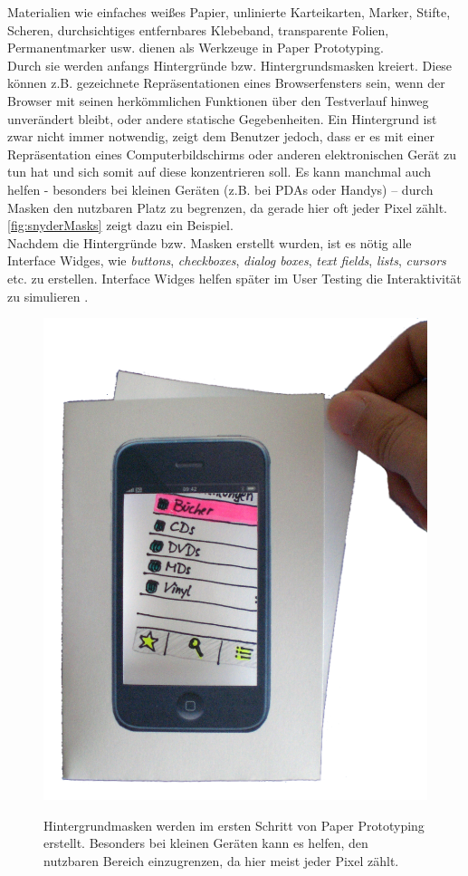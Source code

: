 \medskip Materialien wie einfaches weißes Papier, unlinierte Karteikarten, Marker, Stifte, Scheren, durchsichtiges entfernbares Klebeband, transparente Folien, Permanentmarker usw. dienen als Werkzeuge in Paper Prototyping.\\
Durch sie werden anfangs Hintergründe bzw.  Hintergrundsmasken kreiert. Diese können z.B. gezeichnete Repräsentationen eines Browserfensters sein, wenn der Browser mit seinen herkömmlichen Funktionen über den Testverlauf hinweg unverändert bleibt, oder andere statische Gegebenheiten. Ein Hintergrund ist zwar nicht immer notwendig, zeigt dem Benutzer jedoch, dass er es mit einer Repräsentation eines Computerbildschirms oder anderen elektronischen Gerät zu tun hat und sich somit auf diese konzentrieren soll. Es kann manchmal auch helfen - besonders bei kleinen Geräten (z.B. bei PDAs oder Handys) – durch Masken den nutzbaren Platz zu begrenzen, da gerade hier oft jeder Pixel zählt. \autoref{fig:snyderMasks} zeigt dazu ein Beispiel. \\
Nachdem die Hintergründe bzw. Masken erstellt wurden, ist es nötig alle Interface Widges, wie \emph{buttons}, \emph{checkboxes}, \emph{dialog boxes}, \emph{text fields}, \emph{lists}, \emph{cursors} etc. zu erstellen. Interface Widges helfen später im User Testing die Interaktivität zu simulieren \citep{Snyder:2003}.

\begin{figure}
	\begin{center}
        {\includegraphics[width=.7\linewidth]{gfx/snyderMasks}}
	\end{center}
		\caption[Hintergrundmasken \newline \citep{Snyder:2003}]{Hintergrundmasken werden im ersten Schritt von Paper Prototyping erstellt. Besonders bei kleinen Geräten kann es helfen, den nutzbaren Bereich einzugrenzen, da hier meist jeder Pixel zählt.}\label{fig:snyderMasks}
\end{figure}

